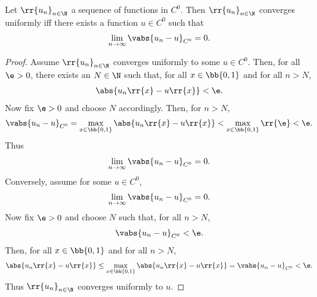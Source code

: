 \documentclass{article}
\begin{document}
\begin{lemma} \label{uniform-iff-pointwise}
	Let $ \rr{u_n}_{n\in\N}$ a sequence of functions in $C^0$. Then $ \rr{u_n}_{n\in\N}$ converges
	uniformly iff there exists a function $u\in C^0$ such that
	\begin{align*}
		\lim_{n\to\infty} \vabs{u_n-u}_{C^0}=0.
	\end{align*}
	\begin{proof}
		Assume $ \rr{u_n}_{n\in\N}$ converges uniformly to some $u\in C^0$. Then, for all $\e > 0$,
		there exists an $N\in\N$ such that, for all $x\in \bb{ 0,1 }$ and for all $n>N$,
		\begin{align*}
			\abs{u_n \rr{ x } - u \rr{ x }} < \e.
		\end{align*}
		Now fix $\e>0$ and choose $N$ accordingly. Then, for $n>N$,
		\begin{align*}
			\vabs{u_n-u}_{C^0} = \max_{x\in \bb{ 0,1 }} \abs{u_n \rr{ x } - u \rr{ x } } < \max_{x\in \bb{0,1}} \rr{\e} < \e.
		\end{align*}
		Thus \begin{align*}
			\lim_{n\to\infty} \vabs{u_n-u}_{C^0} = 0.
		\end{align*}
		Conversely, assume for some $u\in C^0$,
		\begin{align*}
			\lim_{n\to\infty} \vabs{u_n-u}_{C^0} = 0.
		\end{align*}
		Now fix $\e>0$ and choose $N$ such that, for all $n>N$,
		\begin{align*}
			\vabs{u_n-u}_{C^0}<\e.
		\end{align*}
		Then, for all $x\in \bb{ 0,1 }$ and for all $n>N$,
		\begin{align*}
			\abs{u_n \rr{ x } - u \rr{ x }} \leq \max_{x\in \bb{ 0,1 }} \abs{u_n \rr{ x } - u \rr{ x }} = \vabs{u_n-u}_{C^0} < \e.
		\end{align*}
		Thus $ \rr{u_n}_{n\in\N}$ converges uniformly to $u$.
	\end{proof}
\end{lemma}
\end{document}
